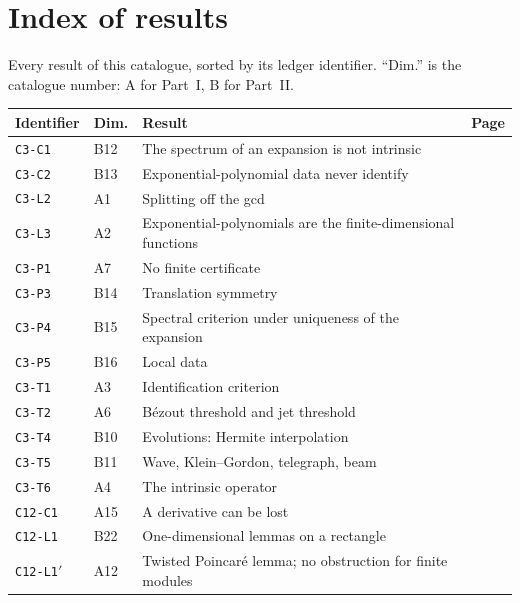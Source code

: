 \documentclass[11pt,a4paper,oneside]{report}
\begin{document}


\appendix

\chapter{Index of results}\label{app:index}
Every result of this catalogue, sorted by its ledger identifier. ``Dim.'' is the catalogue number: A for Part~I, B for Part~II.

\begin{center}\small
\begin{longtable}{@{}L{3.0cm}L{1.2cm}L{8.4cm}L{1.2cm}@{}}
\toprule
Identifier & Dim. & Result & Page\\\midrule\endhead
\texttt{C3-C1} & B12 & The spectrum of an expansion is not intrinsic & \pageref{dim:C3-C1}\\
\texttt{C3-C2} & B13 & Exponential-polynomial data never identify & \pageref{dim:C3-C2}\\
\texttt{C3-L2} & A1 & Splitting off the gcd & \pageref{dim:C3-L2}\\
\texttt{C3-L3} & A2 & Exponential-polynomials are the finite-dimensional functions & \pageref{dim:C3-L3}\\
\texttt{C3-P1} & A7 & No finite certificate & \pageref{dim:C3-P1}\\
\texttt{C3-P3} & B14 & Translation symmetry & \pageref{dim:C3-P3}\\
\texttt{C3-P4} & B15 & Spectral criterion under uniqueness of the expansion & \pageref{dim:C3-P4}\\
\texttt{C3-P5} & B16 & Local data & \pageref{dim:C3-P5}\\
\texttt{C3-T1} & A3 & Identification criterion & \pageref{dim:C3-T1}\\
\texttt{C3-T2} & A6 & B\'ezout threshold and jet threshold & \pageref{dim:C3-T2}\\
\texttt{C3-T4} & B10 & Evolutions: Hermite interpolation & \pageref{dim:C3-T4}\\
\texttt{C3-T5} & B11 & Wave, Klein--Gordon, telegraph, beam & \pageref{dim:C3-T5}\\
\texttt{C3-T6} & A4 & The intrinsic operator & \pageref{dim:C3-T6}\\
\texttt{C12-C1} & A15 & A derivative can be lost & \pageref{dim:C12-C1}\\
\texttt{C12-L1} & B22 & One-dimensional lemmas on a rectangle & \pageref{dim:C12-L1}\\
\texttt{C12-L1$'$} & A12 & Twisted Poincar\'e lemma; no obstruction for finite modules & \pageref{dim:C12-L1'}\\

\end{longtable}
\end{center}
\end{document}
